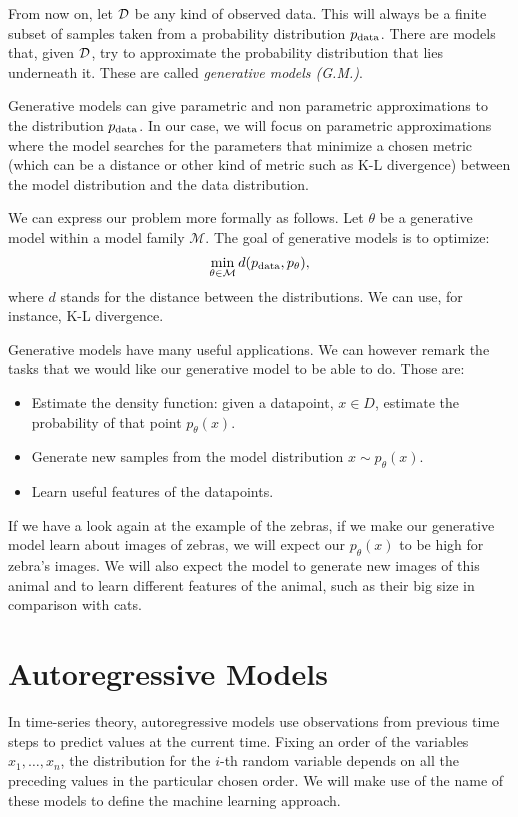 

From now on, let $\mathcal{D}$ be any kind of observed data. This will always be a finite subset of samples taken from a probability distribution $p_{\text{data}}$. There are models that, given $\mathcal{D}$, try to approximate the 
probability distribution that lies underneath it. These are called \emph{generative models (G.M.)}. 

Generative models can give parametric and non parametric approximations to the distribution $p_{\text{data}}$. 
In our case, we will focus on parametric approximations where the model searches for the parameters that minimize a chosen metric (which can be a distance or other kind of metric such as K-L divergence) between the model distribution and the data distribution. 

We can express our problem more formally as follows. Let $\theta$ be a generative model within a model family $\mathcal M$. The goal of generative models is to optimize:
$$
\min_{\theta \in \mathcal M} d(p_{\text{data}},p_\theta),
$$
where $d$ stands for the distance between the distributions. We can use, for instance, K-L divergence.

Generative models have many useful applications. We can however remark the tasks that we would like our generative model to be able to do. Those are:
\begin{itemize}
\item Estimate the density function: given a datapoint, $x \in D$, estimate the probability of that point $p_\theta(x)$.
\item Generate new samples from the model distribution $x \sim p_\theta(x)$.
\item Learn useful features of the datapoints.
\end{itemize}

If we have a look again at the example of the zebras, if we make our generative model learn about images of zebras, we will expect our $p_\theta(x)$ to be high for zebra's images. We will also expect the model
to generate new images of this animal and to learn different features of the animal, such as their big size in comparison with cats.

\section{Autoregressive Models}

In time-series theory, autoregressive models use observations from previous time steps to predict values at the current time. 
Fixing an order of the variables $x_1,\dots,x_n$, the distribution for the $i$-th random variable depends on all the preceding values in the particular chosen order. We will make use of the name of these models to 
define the machine learning approach.

